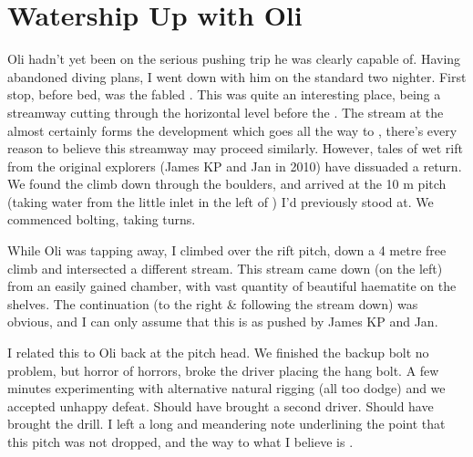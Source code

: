 




\section{Watership Up with Oli}

Oli hadn't yet been on the serious pushing trip he was clearly capable
of. Having abandoned diving plans, I went down with him on the standard
two nighter. First stop, before bed, was the fabled . This was
quite an interesting place, being a streamway cutting through the  horizontal level before the . The 
stream at the  almost certainly forms the development which
goes all the way to , there's every reason to
believe this streamway may proceed similarly. However, tales of wet rift
from the original explorers (James KP and Jan in 2010) have dissuaded a
return. We found the climb down through the boulders, and arrived at the
10 m pitch (taking water from the little inlet in the left of ) I'd previously stood at. We commenced bolting, taking
turns.


While Oli was tapping away, I climbed over the rift pitch, down a 4
metre free climb and intersected a different stream. This stream came
down (on the left) from an easily gained chamber, with vast quantity of
beautiful haematite on the shelves. The continuation (to the right \&
following the stream down) was obvious, and I can only assume that this
is  as pushed by James KP and Jan.

I related this to Oli back at the pitch head. We finished the backup
bolt no problem, but horror of horrors, broke the driver placing the
hang bolt. A few minutes experimenting with alternative natural rigging
(all too dodge) and we accepted unhappy defeat. Should have brought a
second driver. Should have brought the drill. I left a long and
meandering note underlining the point that this pitch was not dropped,
and the way to what I believe is .

